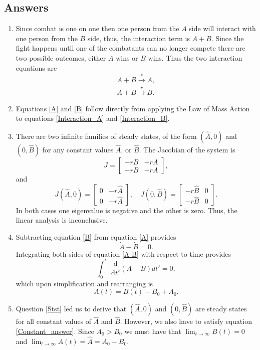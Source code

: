 \documentclass[10pt]{article}
\newcommand{\bb}{\begin{equation}}
\newcommand{\ee}{\end{equation}}
\newcommand{\rd}{\text{ d}}
\newcommand{\eqn}[1]{equation \eqref{#1}}
\newcommand{\eqns}[2]{equations \eqref{#1} and \eqref{#2}}
\renewcommand{\l}{\left(}
\renewcommand{\r}{\right)}
\begin{document}
\begin{Answ}
\subsection{Answers}
\begin{enumerate}
\item Since combat is one on one then one person from the $A$ side will interact with one person from the $B$ side, thus, the interaction term is $A+B$. Since the fight happens until one of the combatants can no longer compete there are two possible outcomes, either $A$ wins or $B$ wins. Thus the two interaction equations are
\begin{align}
A+B\stackrel{r}{\rightarrow}A,\label{Interaction_A}\\
A+B\stackrel{r}{\rightarrow}B.\label{Interaction_B}
\end{align}

\item Equations \eqref{A} and \eqref{B} follow directly from applying the Law of Mass Action to \eqns{Interaction_A}{Interaction_B}.

\item There are two infinite families of steady states, of the form $\l \hat{A},0 \r$ and $\l 0,\hat{B}\r$ for any constant values $\hat{A}$, or $\hat{B}$. The Jacobian of the system is
\bb
J=\left[ \begin{array}{cc} -rB&-rA\\
-rB&-rA
\end {array} \right],
\ee
and
\bb
J(\hat{A},0)=\left[ \begin{array}{cc} 0&-r\hat{A}\\
0&-r\hat{A}
\end {array} \right],\quad J(0,\hat{B})=\left[ \begin{array}{cc} -r\hat{B}&0\\
-r\hat{B}&0
\end {array} \right].
\ee
In both cases one eigenvalue is negative and the other is zero. Thus, the linear analysis is inconclusive.

\item Subtracting \eqn{B} from \eqn{A} provides
\bb
\dot{A}-\dot{B}=0.\label{A-B}
\ee
Integrating both sides of \eqn{A-B} with respect to time provides
\bb
\int^t_0\frac{\rd}{\rd t'}(A-B)dt'=0,
\ee
which upon simplification and rearranging is
\bb
A(t)=B(t)-B_0+A_0.\label{Constant_answer}
\ee

\item Question \ref{Stst} led us to derive that $\l \hat{A},0 \r$ and $\l 0,\hat{B}\r$ are steady states for all constant values of $\hat{A}$ and $\hat{B}$. However, we also have to satisfy \eqn{Constant_answer}. Since $A_0>B_0$ we must have that $\lim_{t\rightarrow\infty} B(t)=0$ and $\lim_{t\rightarrow\infty} A(t)=\hat{A}=A_0-B_0$.



\end{enumerate}
\end{Answ}
\end{document}
